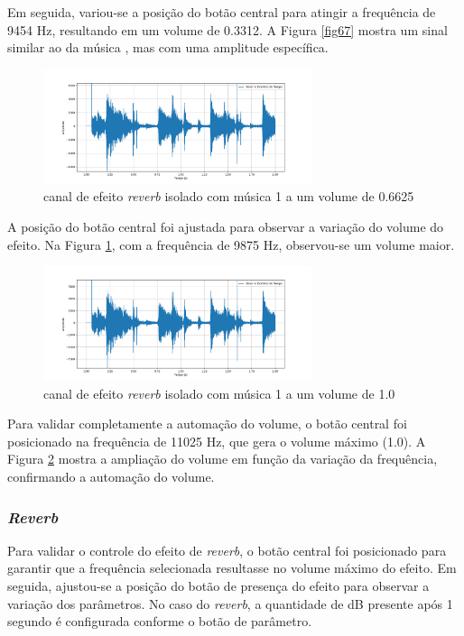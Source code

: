 Em seguida, variou-se a posição do botão central para atingir a frequência de 9454 Hz, resultando em um volume de 0.3312. A Figura \ref{fig67} mostra um sinal similar ao da música \cite{track01}, mas com uma amplitude específica.

\newpage

\begin{figure}[h]
    \centering
    \includegraphics[width=0.7\textwidth]{figuras/fig68.png}
    \caption{canal de efeito \textit{reverb} isolado com música 1 a um volume de 0.6625}
    \label{fig68}
\end{figure}

A posição do botão central foi ajustada para observar a variação do volume do efeito. Na Figura \ref{fig68}, com a frequência de 9875 Hz, observou-se um volume maior.

\begin{figure}[h]
    \centering
    \includegraphics[width=0.7\textwidth]{figuras/fig69.png}
    \caption{canal de efeito \textit{reverb} isolado com música 1 a um volume de 1.0}
    \label{fig69}
\end{figure}
Para validar completamente a automação do volume, o botão central foi posicionado na frequência de 11025 Hz, que gera o volume máximo (1.0). A Figura \ref{fig69} mostra a ampliação do volume em função da variação da frequência, confirmando a automação do volume.

\subsubsection*{\textit{Reverb}}

Para validar o controle do efeito de \textit{reverb}, o botão central foi posicionado para garantir que a frequência selecionada resultasse no volume máximo do efeito. Em seguida, ajustou-se a posição do botão de presença do efeito para observar a variação dos parâmetros. No caso do \textit{reverb}, a quantidade de dB presente após 1 segundo é configurada conforme o botão de parâmetro.

